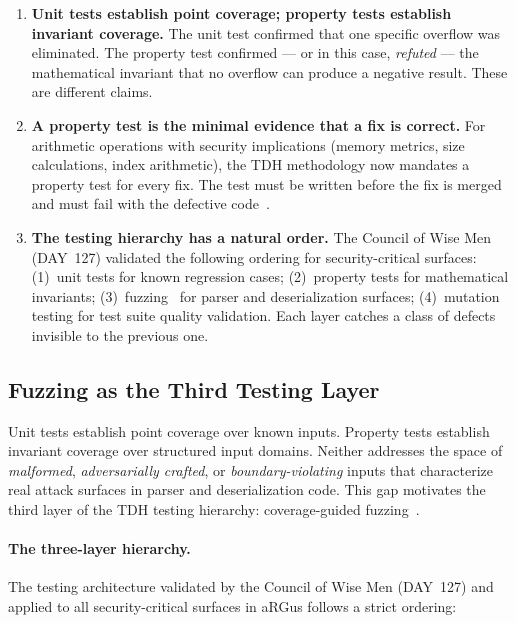 \documentclass[11pt,a4paper]{article}
\begin{document}
    \begin{enumerate}
        \item \textbf{Unit tests establish point coverage; property tests establish invariant coverage.}
        The unit test confirmed that one specific overflow was eliminated. The property test
        confirmed --- or in this case, \emph{refuted} --- the mathematical invariant that
        no overflow can produce a negative result. These are different claims.

        \item \textbf{A property test is the minimal evidence that a fix is correct.}
        For arithmetic operations with security implications (memory metrics, size calculations,
        index arithmetic), the TDH methodology now mandates a property test for every fix.
        The test must be written before the fix is merged and must fail with the defective
        code~\cite{quickcheck2000}.

        \item \textbf{The testing hierarchy has a natural order.}
        The Council of Wise Men (DAY~127) validated the following ordering for security-critical
        surfaces: (1)~unit tests for known regression cases; (2)~property tests for mathematical
        invariants; (3)~fuzzing~\cite{libfuzzer2016} for parser and deserialization surfaces;
        (4)~mutation testing for test suite quality validation. Each layer catches a class of
        defects invisible to the previous one.
    \end{enumerate}


    \subsection{Fuzzing as the Third Testing Layer}
    \label{subsec:fuzzing-third-layer}

    Unit tests establish point coverage over known inputs. Property tests establish
    invariant coverage over structured input domains. Neither addresses the space of
    \emph{malformed}, \emph{adversarially crafted}, or \emph{boundary-violating}
    inputs that characterize real attack surfaces in parser and deserialization code.
    This gap motivates the third layer of the TDH testing hierarchy: coverage-guided
    fuzzing~\cite{libfuzzer2016}.

    \paragraph{The three-layer hierarchy.}
    The testing architecture validated by the Council of Wise Men (DAY~127) and
    applied to all security-critical surfaces in aRGus follows a strict ordering:
\end{document}
